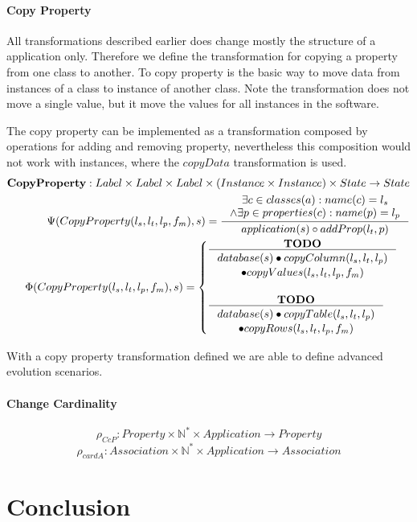 \documentclass[11pt]{article}
\begin{document}
\paragraph{Copy Property}
All transformations described earlier does change mostly the structure of a application only. Therefore we define  the transformation for copying a property from one class to another. To copy property is the basic way to move data from instances of a class to instance of another class. Note the transformation does not move a single value, but it move the values for all instances in the software.

The copy property can be implemented as a transformation composed by operations for adding and removing property, nevertheless this composition would not work with instances, where the $copyData$ transformation is used.
\begin{align*}
	\mathbf{CopyProperty} : Label \times Label \times Label \times (Instance \times Instance) \times State \rightarrow State \\
	\Psi(CopyProperty(l_s, l_t, l_p, f_m), s) = \inference{\exists c \in classes(a) : name(c) = l_s \\ \wedge \exists p \in properties(c) : name(p) = l_p }{application(s) \circ addProp(l_t, p)} \\
	\Phi(CopyProperty(l_s, l_t, l_p, f_m), s) = \begin{cases}
		\inference{\mathbf{TODO}}{\begin{gathered}
			database(s) \bullet copyColumn(l_s, l_t, l_p) \\ \bullet copyValues(l_s, l_t, l_p, f_m) 
			\end{gathered}} \\ \\
		\inference{\mathbf{TODO}}{\begin{gathered}
			database(s) \bullet copyTable(l_s, l_t, l_p) \\ \bullet copyRows(l_s, l_t, l_p, f_m) 
			\end{gathered}}
 \end{cases}
\end{align*}

With a copy property transformation defined we are able to define advanced evolution scenarios.

\paragraph{Change Cardinality}
$$\rho_{CcP} : Property \times \mathbb{N^{*}} \times Application \rightarrow Property $$
$$\rho_{cardA} : Association \times \mathbb{N^{*}} \times Application \rightarrow Association $$

\section{Conclusion}
\end{document}
